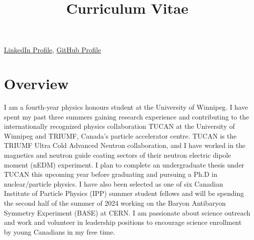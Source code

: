 \documentclass[11pt,roman]{moderncv} %
\title{Curriculum Vitae}
\begin{document}









\makecvtitle %

\href{https://www.linkedin.com/in/thomas-hepworth/}{LinkedIn Profile},
\href{https://github.com/thepworth3?tab=repositories}{GitHub Profile}
\section{Overview}
 I am a fourth-year physics honours student at the University of Winnipeg. I have spent my past three summers gaining research experience and contributing to the internationally recognized physics collaboration TUCAN at the University of Winnipeg and TRIUMF, Canada's particle accelerator centre. TUCAN is the TRIUMF Ultra Cold Advanced Neutron collaboration, and I have worked in the magnetics and neutron guide coating sectors of their neutron electric dipole moment (nEDM) experiment. I plan to complete an undergraduate thesis under TUCAN this upcoming year before graduating and pursuing a Ph.D in nuclear/particle physics. I have also been selected as one of six Canadian Institute of Particle Physics (IPP) summer student fellows and will be spending the second half of the summer of 2024 working on the Baryon Antibaryon Symmetry Experiment (BASE) at CERN. I am passionate about science outreach and work and volunteer in leadership positions to encourage science enrollment by young Canadians in my free time. 
\end{document}
